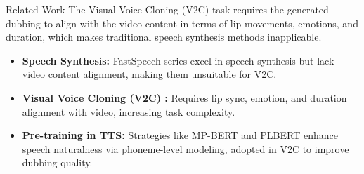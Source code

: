 

\begin{frame}{Related Work}
The Visual Voice Cloning (V2C) task \cite{chen2022v2c} requires the generated dubbing to align with the video content in terms of lip movements, emotions, and duration, which makes traditional speech synthesis methods inapplicable. 
\begin{itemize}
    \item \textbf{Speech Synthesis:} FastSpeech\cite{ren2020fastspeech} series  excel in speech synthesis but lack video content alignment, making them unsuitable for V2C.
    \item \textbf{Visual Voice Cloning (V2C) :} Requires lip sync, emotion, and duration alignment with video, increasing task complexity.\cite{chen2022v2c}
    \item \textbf{Pre-training in TTS:} Strategies like MP-BERT \cite{zhang2022mixed} and PLBERT \cite{li2023phoneme} enhance speech naturalness via phoneme-level modeling, adopted in V2C to improve dubbing quality.
\end{itemize}
\end{frame}